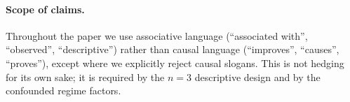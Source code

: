\paragraph{Scope of claims.}
Throughout the paper we use associative language (``associated with'', ``observed'', ``descriptive'') rather than causal language (``improves'', ``causes'', ``proves''), except where we explicitly reject causal slogans.
This is not hedging for its own sake; it is required by the $n{=}3$ descriptive design and by the confounded regime factors.
